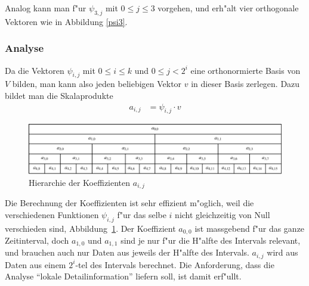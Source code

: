 Analog kann man f"ur $\psi_{3,j}$ mit $0\le j\le 3$ vorgehen, und
erh"alt vier orthogonale Vektoren wie in Abbildung \ref{psi3}.

\subsubsection{Analyse}
Da die Vektoren $\psi_{i,j}$ mit $0\le i\le k$ und
$0\le j< 2^i$ eine orthonormierte Basis von $V$ bilden, man kann also
jeden beliebigen Vektor $v$ in dieser Basis zerlegen.
Dazu bildet man die Skalaprodukte
\begin{align*}
a_{i,j}&=\psi_{i,j}\cdot v
\end{align*}
\begin{figure}
\begin{center}
\includegraphics[width=\hsize]{images/signal-4}
\end{center}
\caption{Hierarchie der Koeffizienten $a_{i,j}$\label{coefhierarchy}}
\end{figure}
Die Berechnung der Koeffizienten ist sehr effizient m"oglich, weil die
verschiedenen Funktionen $\psi_{i,j}$ f"ur das selbe $i$ nicht gleichzeitig
von Null verschieden sind, Abbildung~\ref{coefhierarchy}.
Der Koeffizient $a_{0,0}$ ist massgebend f"ur das ganze Zeitinterval,
doch $a_{1,0}$ und $a_{1,1}$ sind je nur f"ur die H"alfte des Intervals
relevant, und brauchen auch nur Daten aus jeweils der H"alfte
des Intervals. $a_{i,j}$ wird aus Daten aus einem $2^i$-tel des
Intervals berechnet.
Die Anforderung, dass die Analyse ``lokale Detailinformation''
liefern soll, ist damit erf"ullt.

